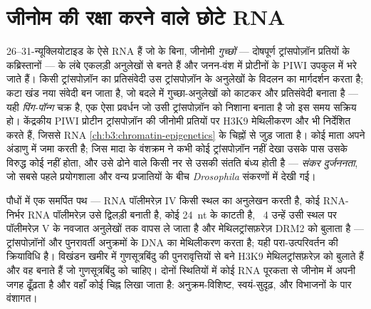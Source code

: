 \section{जीनोम की रक्षा करने वाले छोटे RNA}

\begin{definition}\label{def:b3:rna-regulation:pirna}
\emph{} \numrange{26}{31}-न्यूक्लियोटाइड के ऐसे RNA हैं जो 
के बिना, जीनोमी \emph{ गुच्छों} --- दोषपूर्ण ट्रांसपोज़ॉन
प्रतियों के कब्रिस्तानों --- के लंबे एकलड़ी अनुलेखों से बनते हैं और
जनन-वंश में  प्रोटीनों के PIWI उपकुल में भरे जाते हैं। किसी
ट्रांसपोज़ॉन का प्रतिसंवेदी  उस ट्रांसपोज़ॉन के अनुलेखों के विदलन
का मार्गदर्शन करता है; कटा खंड नया संवेदी  बन जाता है, जो बदले में
गुच्छा-अनुलेखों को काटकर और प्रतिसंवेदी  बनाता है --- यही
\emph{पिंग-पॉन्ग} चक्र है, एक ऐसा प्रवर्धन जो उसी ट्रांसपोज़ॉन को
निशाना बनाता है जो इस समय सक्रिय हो। केंद्रकीय PIWI प्रोटीन
ट्रांसपोज़ॉन की जीनोमी प्रतियों पर H3K9 मेथिलीकरण और  भी
निर्देशित करते हैं, जिससे RNA \cref{ch:b3:chromatin-epigenetics} के
 चिह्नों से जुड़ जाता है। कोई माता अपने  अंडाणु में जमा
करती है; जिस मादा के वंशक्रम ने कभी कोई ट्रांसपोज़ॉन नहीं देखा उसके पास
उसके विरुद्ध कोई  नहीं होता, और उसे ढोने वाले किसी नर से उसकी
संतति बंध्य होती है --- \emph{संकर दुर्जननता}, जो सबसे पहले प्रयोगशाला
और वन्य प्रजातियों के बीच \emph{Drosophila} संकरणों में देखी गई।
\end{definition}

\begin{proposition}\label{prop:b3:rna-regulation:rddm}
पौधों में एक समर्पित पथ --- RNA पॉलीमरेज़ IV किसी स्थल का अनुलेखन करती
है, कोई RNA-निर्भर RNA पॉलीमरेज़ उसे द्विलड़ी बनाती है, कोई 
\qty{24}{nt} के  काटती है, ~4 उन्हें उसी स्थल पर
पॉलीमरेज़ V के नवजात अनुलेखों तक वापस ले जाता है और मेथिलट्रांसफ़रेज़
DRM2 को बुलाता है --- ट्रांसपोज़ॉनों और पुनरावर्ती अनुक्रमों के DNA का
मेथिलीकरण करता है; यही परा-उत्परिवर्तन की क्रियाविधि है। विखंडन खमीर
में गुणसूत्रबिंदु की पुनरावृत्तियों से बने  H3K9
मेथिलट्रांसफ़रेज़ को बुलाते हैं और वह  बनाते हैं जो
गुणसूत्रबिंदु को चाहिए। दोनों स्थितियों में कोई RNA पूरकता से जीनोम में
अपनी जगह ढूँढ़ता है और वहाँ कोई  चिह्न लिखा जाता है:
अनुक्रम-विशिष्ट, स्वयं-सुदृढ़, और विभाजनों के पार वंशागत।
\end{proposition}

